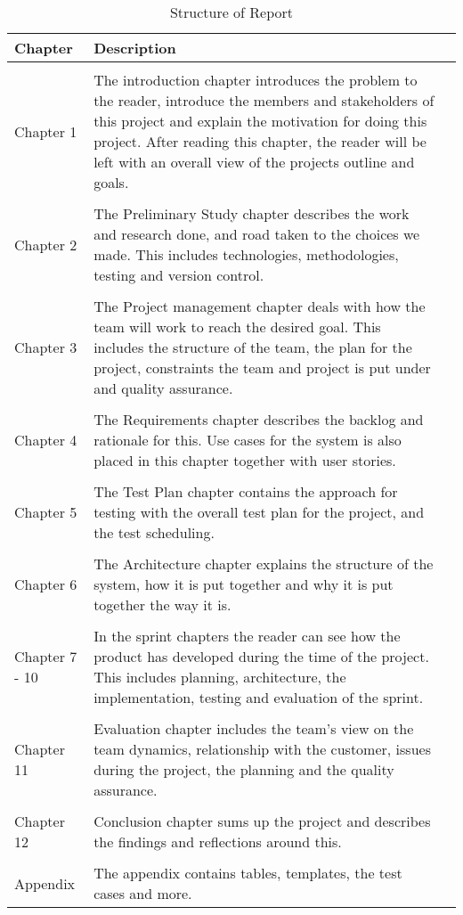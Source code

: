 \begin{table}
\centering
\begin{tabularx}{\textwidth}{ l X l }
  \textbf{Chapter}      & \textbf{Description} \\
  \hline \\ [-1.5ex]
  Chapter 1   & The introduction chapter introduces the problem to the reader, introduce the members and stakeholders of this project and explain the motivation for doing this project. After reading this chapter, the reader will be left with an overall view of the projects outline and goals. \vspace*{0.7ex} \\
  \hline \\ [-1.5ex]
  Chapter 2                   & The Preliminary Study chapter describes the work and research done, and road taken to the choices we made. This includes technologies, methodologies, testing and version control. \\
  \hline \\ [-1.5ex]
  Chapter 3          & The Project management chapter deals with how the team will work to reach the desired goal. This includes the structure of the team, the plan for the project, constraints the team and project is put under and quality assurance. \\
  \hline \\ [-1.5ex]
  Chapter 4   & The Requirements chapter describes the backlog and rationale for this. Use cases for the system is also placed in this chapter together with user stories. \\
  \hline \\ [-1.5ex]
  Chapter 5                    & The Test Plan chapter contains the approach for testing with the overall test plan for the project, and the test scheduling. \\
  \hline \\ [-1.5ex]
  Chapter 6              & The Architecture chapter explains the structure of the system, how it is put together and why it is put together the way it is. \\
  \hline \\ [-1.5ex]
  Chapter 7 - 10              & In the sprint chapters the reader can see how the product has developed during the time of the project. This includes planning, architecture, the implementation, testing and evaluation of the sprint. \\
  \hline \\ [-1.5ex]
  Chapter 11              & Evaluation chapter includes the team's view on the team dynamics, relationship with the customer, issues during the project, the planning and the quality assurance. \\
  \hline \\ [-1.5ex]
  Chapter 12              & Conclusion chapter sums up the project and describes the findings and reflections around this. \\
  \hline \\ [-1.5ex]
  Appendix              & The appendix contains tables, templates, the test cases and more. \\
\end{tabularx}
\caption{Structure of Report}
\label{table-reportstructure}
\end{table}